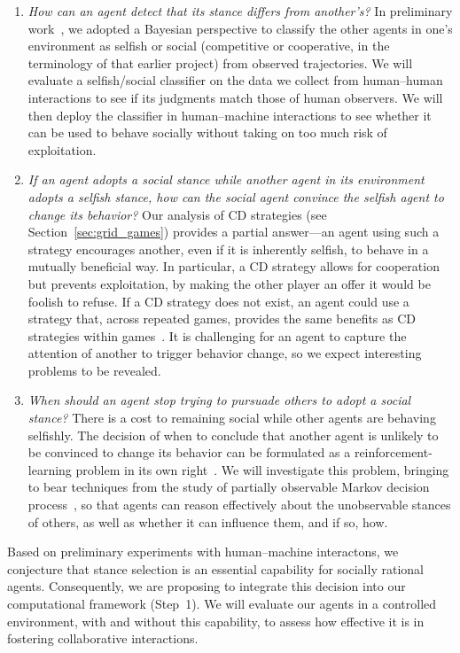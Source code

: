\begin{enumerate}

\item \emph{How can an agent detect that its stance differs from another's?}
  In preliminary work~\cite{kleiman16}, we adopted a Bayesian
  perspective to classify the other agents in one's environment as
  selfish or social (competitive or cooperative, in the terminology of
  that earlier project) from observed trajectories. We will evaluate a
  selfish/social classifier on the data we collect from human--human
  interactions to see if its judgments match those of human
  observers. We will then deploy the classifier in human--machine
  interactions to see whether it can be used to behave socially
  without taking on too much risk of exploitation.
  
\item \emph{If an agent adopts a social stance while another agent in 
  its environment adopts a selfish stance, how can the social agent
  convince the selfish agent to change its behavior?}  Our analysis of
  CD strategies (see Section~\ref{sec:grid_games}) provides a partial
  answer---an agent using such a strategy encourages another, even if
  it is inherently selfish, to behave in a mutually beneficial way.
  In particular, a CD strategy allows for cooperation but prevents
  exploitation, by making the other player an offer it would be
  foolish to refuse.  If a CD strategy does not exist, an agent could
  use a strategy that, across repeated games, provides the same
  benefits as CD strategies within games~\cite{munoz08}. It is
  challenging for an agent to capture the attention of another to
  trigger behavior change, so we expect interesting problems to be
  revealed.

\item \emph{When should an agent stop trying to pursuade others to
  adopt a social stance?}  There is a cost to remaining social while
  other agents are behaving selfishly.  The decision of when to
  conclude that another agent is unlikely to be convinced to change
  its behavior can be formulated as a reinforcement-learning problem
  in its own right~\cite{boutilier1996planning}.  We will investigate
  this problem, bringing to bear techniques from the study of
  partially observable Markov decision process~\cite{kaelbling98}, so
  that agents can reason effectively about the unobservable stances of
  others, as well as whether it can influence them, and if so, how.
  
\end{enumerate}

Based on preliminary experiments with human--machine interactons, we
conjecture that stance selection is an essential capability for
socially rational agents.  Consequently, we are proposing to integrate
this decision into our computational framework (Step~1).  We will
evaluate our agents in a controlled environment, with and without this
capability, to assess how effective it is in fostering collaborative
interactions.

